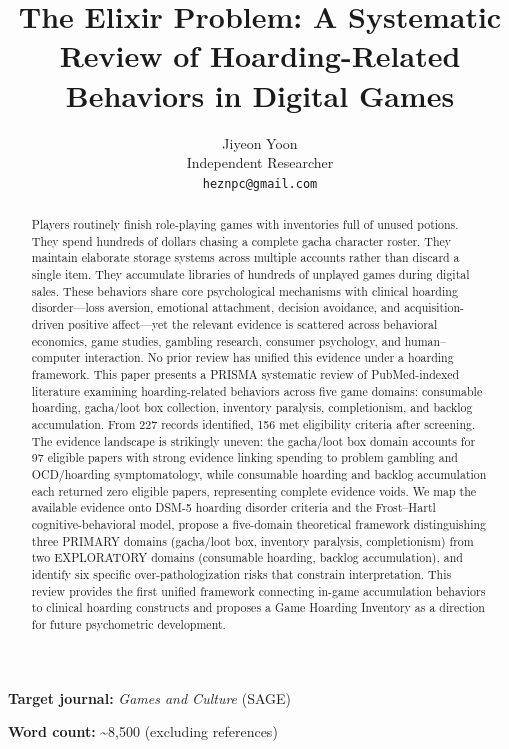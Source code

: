 \documentclass[12pt]{article}
\title{The Elixir Problem: A Systematic Review of Hoarding-Related Behaviors in Digital Games}
\author{Jiyeon Yoon\\
Independent Researcher\\
\texttt{heznpc@gmail.com}}
\date{}
\begin{document}
\maketitle

\noindent\textbf{Target journal:} \textit{Games and Culture} (SAGE)

\noindent\textbf{Word count:} \textasciitilde{}8,500 (excluding references)

\begin{abstract}
Players routinely finish role-playing games with inventories full of unused potions. They spend hundreds of dollars chasing a complete gacha character roster. They maintain elaborate storage systems across multiple accounts rather than discard a single item. They accumulate libraries of hundreds of unplayed games during digital sales. These behaviors share core psychological mechanisms with clinical hoarding disorder---loss aversion, emotional attachment, decision avoidance, and acquisition-driven positive affect---yet the relevant evidence is scattered across behavioral economics, game studies, gambling research, consumer psychology, and human--computer interaction. No prior review has unified this evidence under a hoarding framework. This paper presents a PRISMA systematic review of PubMed-indexed literature examining hoarding-related behaviors across five game domains: consumable hoarding, gacha/loot box collection, inventory paralysis, completionism, and backlog accumulation. From 227 records identified, 156 met eligibility criteria after screening. The evidence landscape is strikingly uneven: the gacha/loot box domain accounts for 97 eligible papers with strong evidence linking spending to problem gambling and OCD/hoarding symptomatology, while consumable hoarding and backlog accumulation each returned zero eligible papers, representing complete evidence voids. We map the available evidence onto DSM-5 hoarding disorder criteria and the Frost--Hartl cognitive-behavioral model, propose a five-domain theoretical framework distinguishing three PRIMARY domains (gacha/loot box, inventory paralysis, completionism) from two EXPLORATORY domains (consumable hoarding, backlog accumulation), and identify six specific over-pathologization risks that constrain interpretation. This review provides the first unified framework connecting in-game accumulation behaviors to clinical hoarding constructs and proposes a Game Hoarding Inventory as a direction for future psychometric development.
\end{abstract}
\end{document}
